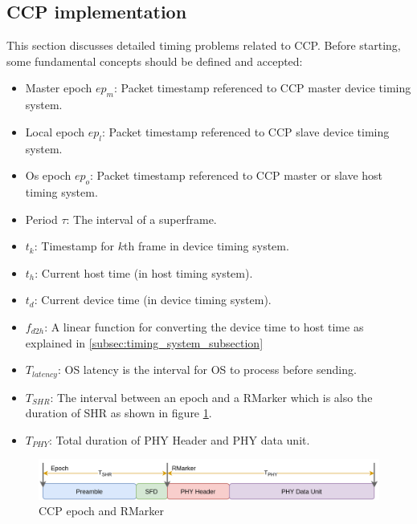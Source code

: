 \documentclass[\main/main.tex]{subfiles}
\begin{document}
\subsection{CCP implementation}
This section discusses detailed timing problems related to CCP. Before starting, some fundamental concepts should be defined and accepted:
\begin{itemize}
    \item Master epoch $ep_m$: Packet timestamp referenced to CCP master device timing system.
    \item Local epoch $ep_l$: Packet timestamp referenced to CCP slave device timing system.
    \item Os epoch $ep_o$: Packet timestamp referenced to CCP master or slave host timing system.
    \item Period $\tau$: The interval of a superframe.
    \item $t_k$: Timestamp for $k$th frame in device timing system.
    \item $t_h$: Current host time (in host timing system).
    \item $t_d$: Current device time (in device timing system).
    \item $f_{d2h}$: A linear function for converting the device time to host time as explained in \ref{subsec:timing_system_subsection}
    \item $T_{latency}$: OS latency is the interval for OS to process before sending.
    \item $T_{SHR}$: The interval between an epoch and a RMarker which is also the duration of SHR as shown in figure \ref{fig:ccp_epoch_and_rmarker}.
    \item $T_{PHY}$: Total duration of PHY Header and PHY data unit.
\end{itemize}
\begin{figure}[H]
    \begin{center}
        \includegraphics[scale=0.35]{ccp_epoch_and_rmarker.png}
    \end{center}
    \caption{CCP epoch and RMarker}
    \label{fig:ccp_epoch_and_rmarker}
\end{figure}
\end{document}
